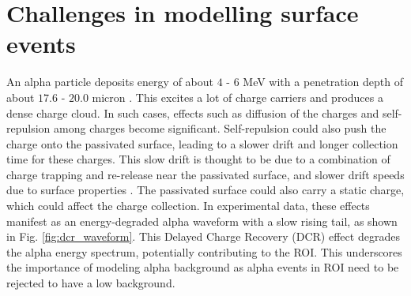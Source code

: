 

\section{Challenges in modelling surface events}
An alpha particle deposits energy of about $4$ - $6$ MeV with a penetration depth of about $17.6$ - $20.0$ micron \cite{knoll_2010}. This excites a lot of charge carriers and produces a dense charge cloud. In such cases, effects such as diffusion of the charges and self-repulsion among charges become significant. Self-repulsion could also push the charge onto the passivated surface, leading to a slower drift and longer collection time for these charges. This slow drift is thought to be due to a combination of charge trapping and re-release near the passivated surface, and slower drift speeds due to surface properties \cite{MULLOWNEY201233}. The passivated surface could also carry a static charge, which could affect the charge collection. In experimental data, these effects manifest as an energy-degraded alpha waveform with a slow rising tail, as shown in Fig. \ref{fig:dcr_waveform}. This Delayed Charge Recovery (DCR) effect degrades the alpha energy spectrum, potentially contributing to the ROI. This underscores the importance of modeling alpha background as alpha events in ROI need to be rejected to have a low background. 


